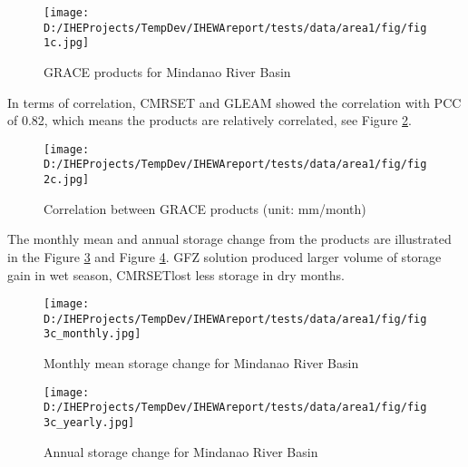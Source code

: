 \documentclass[oneside,openany]{article}%
\begin{document}
\begin{figure}[H]%
\centering%
\texttt{[image: D:/IHEProjects/TempDev/IHEWAreport/tests/data/area1/fig/fig1c.jpg]}%
\caption{GRACE products for Mindanao River Basin}%
\label{figure:fig11}%
\end{figure}

%
In terms of correlation, CMRSET and GLEAM showed the correlation with PCC of 0.82, which means the products are relatively correlated, see Figure \ref{figure:fig12}.%
\linebreak%


\begin{figure}[H]%
\centering%
\texttt{[image: D:/IHEProjects/TempDev/IHEWAreport/tests/data/area1/fig/fig2c.jpg]}%
\caption{Correlation between GRACE products (unit: mm/month)}%
\label{figure:fig12}%
\end{figure}

%
The monthly mean and annual storage change from the products are illustrated in the Figure \ref{figure:fig13} and Figure \ref{figure:fig14}. GFZ solution produced larger volume of storage gain in wet season, CMRSETlost less storage in dry months.%
\linebreak%


\begin{figure}[H]%
\centering%
\texttt{[image: D:/IHEProjects/TempDev/IHEWAreport/tests/data/area1/fig/fig3c\_monthly.jpg]}%
\caption{Monthly mean storage change for Mindanao River Basin}%
\label{figure:fig13}%
\end{figure}

%


\begin{figure}[H]%
\centering%
\texttt{[image: D:/IHEProjects/TempDev/IHEWAreport/tests/data/area1/fig/fig3c\_yearly.jpg]}%
\caption{Annual storage change  for Mindanao River Basin}%
\label{figure:fig14}%
\end{figure}

%
\end{document}
